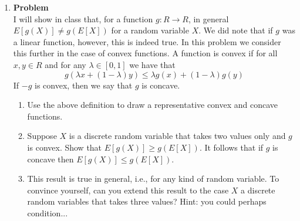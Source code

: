\documentclass[12pt]{article}
\newenvironment{Ex}{\textbf{Problem}\vspace{.75em}\\}{}
\begin{document}
\begin{enumerate}
\begin{Ex}
\begin{enumerate}
        proportionality constant does not exist and thus there is no
        PMF.
      \item What is the expected value of $X$ when $\alpha = 2$?
      \item Suppose there are a finite number of items, so $x =
        1,2,\ldots, n$ and now let $\alpha = 1$. Find an expression,
        in terms of $n$ for the proportionality constant for the PMF.
      \item How many times more likely is the most popular item versus
        the $x$th most popular item. For some large but finite $n$
        compare this to the case where the popularity profile is given
        by a geometric distribution. Which distribution concentrates
        more probability on the higher ranked, i.e., lower $x$,
        values?
      \end{enumerate}
      \begin{solution} \hfill \\
        {\huge TODO}
      \end{solution}
    \end{Ex}
  \item
    \begin{Ex}
      I will show in class that, for a function $g : R \rightarrow R$,
      in general $E[g(X)] \not= g(E[X])$ for a random variable $X$. We
      did note that if $g$ was a linear function, however, this is
      indeed true. In this problem we consider this further in the
      case of convex functions. A function is convex if for all $x, y
      \in R$ and for any $\lambda \in [0, 1]$ we have that
      $$ g(\lambda x + (1-\lambda)y) \le \lambda g(x) +
      (1-\lambda)g(y)$$
      If $-g$ is convex, then we say that $g$ is concave.
      \begin{enumerate}
      \item Use the above definition to draw a representative convex
        and concave functions.
      \item Suppose $X$ is a discrete random variable that takes two
        values only and $g$ is convex. Show that $E[g(X)] \ge
        g(E[X])$. It follows that if $g$ is concave then $E[g(X)] \le
        g(E[X])$.
      \item This result is true in general, i.e., for any kind of
        random variable. To convince yourself, can you extend this
        result to the case $X$ a discrete random variables that takes
        three values? Hint: you could perhaps condition...
      \end{enumerate}

\end{Ex}
\end{enumerate}
\end{document}
